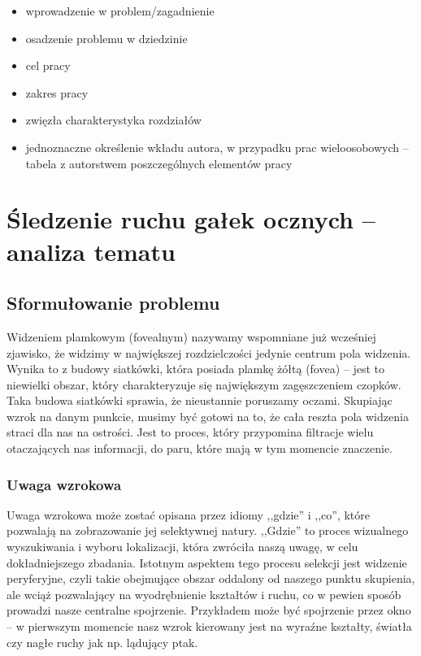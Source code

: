 \documentclass[a4paper,twoside,12pt]{book}
\begin{document}
\begin{itemize}
\item wprowadzenie w problem/zagadnienie
\item osadzenie problemu w dziedzinie
\item cel pracy
\item zakres pracy
\item zwięzła charakterystyka rozdziałów
\item jednoznaczne określenie wkładu autora, w przypadku prac wieloosobowych – tabela z autorstwem poszczególnych elementów pracy
\end{itemize}



%
%
%
\chapter{Śledzenie ruchu gałek ocznych -- analiza tematu}
\label{ch:analiza-tematu}

\section{Sformułowanie problemu}
\label{sec:sformulowanie-problemu}

Widzeniem plamkowym (fovealnym) nazywamy wspomniane już wcześniej zjawisko, że widzimy w największej rozdzielczości jedynie centrum pola widzenia. Wynika to z budowy siatkówki, która posiada plamkę żółtą (fovea) -- jest to niewielki obszar, który charakteryzuje się największym zagęszczeniem czopków. Taka budowa siatkówki sprawia, że nieustannie poruszamy oczami. Skupiając wzrok na danym punkcie, musimy być gotowi na to, że cała reszta pola widzenia straci dla nas na ostrości. Jest to proces, który przypomina filtracje wielu otaczających nas informacji, do paru, które mają w tym momencie znaczenie.

\subsection{Uwaga wzrokowa}
\label{subsec:uwaga-wzrokowa}

Uwaga wzrokowa może zostać opisana przez idiomy ,,gdzie'' i ,,co'', które pozwalają na zobrazowanie jej selektywnej natury. ,,Gdzie'' to proces wizualnego wyszukiwania i wyboru lokalizacji, która zwróciła naszą uwagę, w celu dokładniejszego zbadania. Istotnym aspektem tego procesu selekcji jest widzenie peryferyjne, czyli takie obejmujące obszar oddalony od naszego punktu skupienia, ale wciąż pozwalający na wyodrębnienie kształtów i ruchu, co w pewien sposób prowadzi nasze centralne spojrzenie. Przykładem może być spojrzenie przez okno -- w pierwszym momencie nasz wzrok kierowany jest na wyraźne kształty, światła czy nagłe ruchy jak np. lądujący ptak. 
\end{document}
